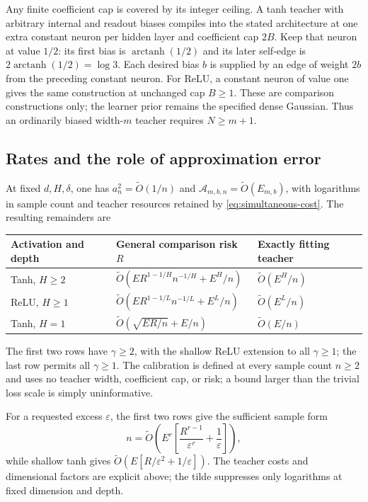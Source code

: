 \begin{remark}
Any finite coefficient cap is covered by its integer ceiling. A tanh teacher with arbitrary internal and readout biases compiles into the stated architecture at one extra constant neuron per hidden layer and coefficient cap $2B$. Keep that neuron at value $1/2$: its first bias is $\operatorname{arctanh}(1/2)$ and its later self-edge is $2\operatorname{arctanh}(1/2)=\log3$. Each desired bias $b$ is supplied by an edge of weight $2b$ from the preceding constant neuron. For ReLU, a constant neuron of value one gives the same construction at unchanged cap $B\ge1$. These are comparison constructions only; the learner prior remains the specified dense Gaussian. Thus an ordinarily biased width-$m$ teacher requires $N\ge m+1$.
\end{remark}

\subsection{Rates and the role of approximation error}
At fixed $d,H,\delta$, one has $a_n^2=\widetilde O(1/n)$ and
$\mathcal A_{m,b,n}=\widetilde O(E_{m,b})$, with logarithms in sample count and teacher resources retained by \eqref{eq:simultaneous-cost}. The resulting remainders are
\begin{center}
\begin{tabular}{lll}
\toprule
Activation and depth & General comparison risk $R$ & Exactly fitting teacher \\
\midrule
Tanh, $H\ge2$ & $\widetilde O(E R^{1-1/H}n^{-1/H}+E^H/n)$ & $\widetilde O(E^H/n)$ \\
ReLU, $H\ge1$ & $\widetilde O(E R^{1-1/L}n^{-1/L}+E^L/n)$ & $\widetilde O(E^L/n)$ \\
Tanh, $H=1$ & $\widetilde O(\sqrt{ER/n}+E/n)$ & $\widetilde O(E/n)$ \\
\bottomrule
\end{tabular}
\end{center}
The first two rows have $\gamma\ge2$, with the shallow ReLU extension to all $\gamma\ge1$; the last row permits all $\gamma\ge1$. The calibration is defined at every sample count $n\ge2$ and uses no teacher width, coefficient cap, or risk; a bound larger than the trivial loss scale is simply uninformative.

For a requested excess $\varepsilon$, the first two rows give the sufficient sample form
\begin{equation}
 n=\widetilde O\left(E^r\left[\frac{R^{r-1}}{\varepsilon^r}
                                      +\frac1\varepsilon\right]\right),
 \label{eq:adaptive-sample}
\end{equation}
while shallow tanh gives
$\widetilde O(E[R/\varepsilon^2+1/\varepsilon])$.
The teacher costs and dimensional factors are explicit above; the tilde suppresses only logarithms at fixed dimension and depth.

